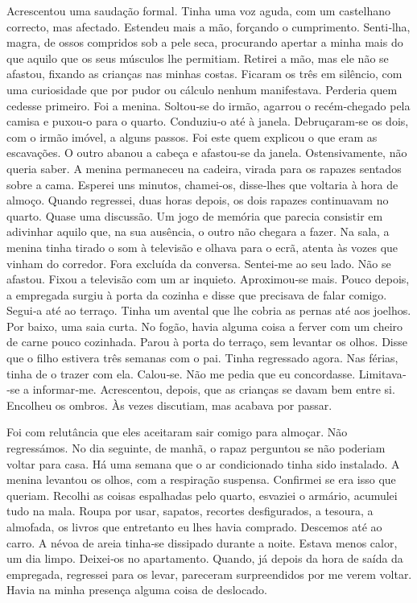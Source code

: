 Acrescentou uma saudação formal. Tinha uma voz aguda, com um castelhano
correcto, mas afectado. Estendeu mais a mão, forçando o cumprimento.
Senti­‑lha, magra, de ossos compridos sob a pele seca, procurando
apertar a minha mais do que aquilo que os seus músculos lhe permitiam.
Retirei a mão, mas ele não se afastou, fixando as crianças nas minhas
costas. Ficaram os três em silêncio, com uma curiosidade que por pudor
ou cálculo nenhum manifestava. Perderia quem cedesse primeiro. Foi a
menina. Soltou­‑se do irmão, agarrou o recém­‑chegado pela camisa e
puxou­‑o para o quarto. Conduziu­‑o até à janela. Debruçaram­‑se os
dois, com o irmão imóvel, a alguns passos. Foi este quem explicou o que
eram as escavações. O outro abanou a cabeça e afastou­‑se da janela.
Ostensivamente, não queria saber. A menina permaneceu na cadeira, virada
para os rapazes sentados sobre a cama. Esperei uns minutos, chamei­‑os,
disse­‑lhes que voltaria à hora de almoço. Quando regressei, duas horas
depois, os dois rapazes continuavam no quarto. Quase uma discussão. Um
jogo de memória que parecia consistir em adivinhar aquilo que, na sua
ausência, o outro não chegara a fazer. Na sala, a menina tinha tirado o
som à televisão e olhava para o ecrã, atenta às vozes que vinham do
corredor. Fora excluída da conversa. Sentei­‑me ao seu lado. Não se
afastou. Fixou a televisão com um ar inquieto. Aproxi­mou­‑se mais.
Pouco depois, a empregada surgiu à porta da cozinha e disse que
precisava de falar comigo. Segui­‑a até ao terraço. Tinha um avental que
lhe cobria as pernas até aos joelhos. Por baixo, uma saia curta. No
fogão, havia alguma coisa a ferver com um cheiro de carne pouco
cozinhada. Parou à porta do terraço, sem levantar os olhos. Disse que o
filho estivera três semanas com o pai. Tinha regressado agora. Nas
férias, tinha de o trazer com ela. Calou­‑se. Não me pedia que eu
concordasse. Limitava­‑se a informar­‑me. Acrescentou, depois, que as
crianças se davam bem entre si. Encolheu os ombros. Às vezes discutiam,
mas acabava por passar.

Foi com relutância que eles aceitaram sair comigo para almoçar. Não
regressámos. No dia seguinte, de manhã, o rapaz perguntou se não
poderiam voltar para casa. Há uma semana que o ar condicionado tinha
sido instalado. A menina levantou os olhos, com a respiração suspensa.
Confirmei se era isso que queriam. Recolhi as coisas espalhadas pelo
quarto, esvaziei o armário, acumulei tudo na mala. Roupa por usar,
sapatos, recortes desfigurados, a tesoura, a almofada, os livros que
entretanto eu lhes havia comprado. Descemos até ao carro. A névoa de
areia tinha­‑se dissipado durante a noite. Estava menos calor, um dia
limpo. Deixei­‑os no apartamento. Quando, já depois da hora de saída da
empregada, regressei para os levar, pareceram surpreendidos por me verem
voltar. Havia na minha presença alguma coisa de deslocado.

